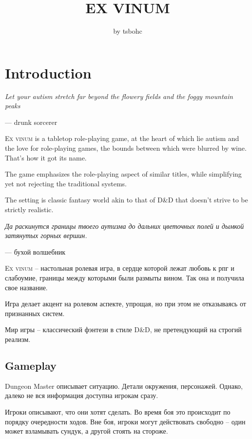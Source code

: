 \documentclass[a5paper,11pt]{book}
\title{\textbf{EX VINUM}}
\author{by tsbohc}
\date{}
\begin{document}
\maketitle
\thispagestyle{empty}
\enlargethispage{\baselineskip}
\tableofcontents
\pagebreak

\chapter{Introduction}
\begin{multicols}{2}

\begin{en}
\epigraph{\emph{Let your autism stretch far beyond the flowery fields and the foggy mountain peaks}}{--- drunk sorcerer}

\lettrine{E}{x vinum} is a tabletop role-playing game, at the heart of which lie autism and the love for role-playing games, the bounds between which were blurred by wine. That's how it got its name.

The game emphasizes the role-playing aspect of similar titles, while simplifying yet not rejecting the traditional systems.

The setting is classic fantasy world akin to that of D\&D that doesn't strive to be strictly realistic.
\end{en}

\begin{ru}
\epigraph{\emph{Да раскинутся границы твоего аутизма до дальних цветочных полей и дымкой затянутых горных вершин.}}{--- бухой волшебник}

\lettrine{E}{x vinum} -- настольная ролевая игра, в сердце которой лежат любовь к рпг и слабоумие, границы между которыми были размыты вином. Так она и получила свое название.

Игра делает акцент на ролевом аспекте, упрощая, но при этом не отказываясь от признанных систем.

Мир игры -- классический фэнтези в стиле D\&D, не претендующий на строгий реализм.
\end{ru}

\section{Gameplay}
\begin{ru}
Dungeon Master описывает ситуацию. Детали окружения, персонажей. Однако, далеко не вся информация доступна игрокам сразу.

Игроки описывают, что они хотят сделать. Во время боя это происходит по порядку очередности ходов. Вне боя, игроки могут действовать свободно -- один может взламывать сундук, а другой стоять на стороже.


\end{ru}
\end{multicols}
\end{document}
